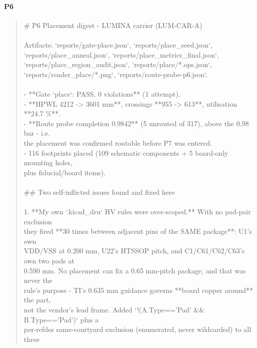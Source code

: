 \documentclass[11pt,a4paper]{article}
\begin{document}
\paragraph*{P6}
\begin{quote}\small\ttfamily\raggedright
\# P6 Placement digest - LUMINA carrier (LUM-CAR-A)\\
~\\
Artifacts: `reports/gate-place.json`, `reports/place\_seed.json`,\\
`reports/place\_anneal.json`, `reports/place\_metrics\_final.json`,\\
`reports/place\_region\_audit.json`, `reports/place/{*}.ops.json`,\\
`reports/render\_place/{*}.png`, `reports/route-probe-p6.json`.\\
~\\
- {*}{*}Gate `place`: PASS, 0 violations{*}{*} (1 attempt).\\
- {*}{*}HPWL 4212 -\textgreater{} 3601 mm{*}{*}, crossings {*}{*}955 -\textgreater{} 613{*}{*}, utilisation {*}{*}24.7 \%{*}{*}.\\
- {*}{*}Route probe completion 0.9842{*}{*} (5 unrouted of 317), above the 0.98 bar - i.e.\\
  the placement was confirmed routable before P7 was entered.\\
- 116 footprints placed (109 schematic components + 5 board-only mounting holes,\\
  plus fiducial/board items).\\
~\\
\#\# Two self-inflicted issues found and fixed here\\
~\\
1. {*}{*}My own `.kicad\_dru` HV rules were over-scoped.{*}{*} With no pad-pair exclusion\\
   they fired {*}{*}30 times between adjacent pins of the SAME package{*}{*}: U1's own\\
   VDD/VSS at 0.200 mm, U22's HTSSOP pitch, and C1/C61/C62/C63's own two pads at\\
   0.590 mm. No placement can fix a 0.65 mm-pitch package, and that was never the\\
   rule's purpose - TI's 0.635 mm guidance governs {*}{*}board copper around{*}{*} the part,\\
   not the vendor's lead frame. Added `!(A.Type=='Pad' \&\& B.Type=='Pad')` plus a\\
   per-refdes same-courtyard exclusion (enumerated, never wildcarded) to all three\\

\end{quote}
\end{document}
